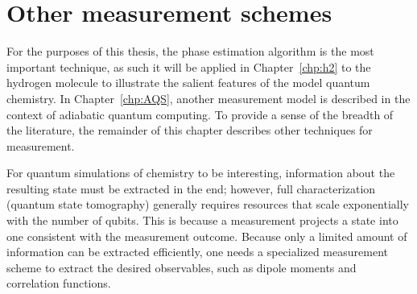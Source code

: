 \documentclass[11pt,oneside,final]{huthesis}%
\begin{document}
%
\section{Other measurement schemes}
\label{ssec:Measuring}

For the purposes of this thesis, the phase estimation algorithm is the most important
technique, as such it will be applied in Chapter~\ref{chp:h2} to the hydrogen molecule to illustrate the salient features of the model quantum chemistry. In 
Chapter~\ref{chp:AQS}, another measurement model is described in the context of 
adiabatic quantum computing.  To provide a sense of the breadth of the literature,
the remainder of this chapter describes other techniques for measurement.

For quantum simulations of chemistry to be interesting, information about the 
resulting state must be extracted in the end;
however, full characterization (quantum state tomography) generally requires
resources that scale exponentially with the number of qubits. This is because a
measurement projects a state into one consistent with the measurement outcome.
Because only a limited amount of information can be extracted efficiently, one
needs a specialized measurement scheme to extract the desired observables, such
as dipole moments and correlation functions.
\end{document}
